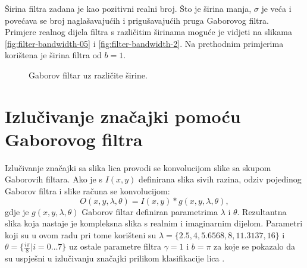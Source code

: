 \documentclass{ru}
\begin{document}
Širina filtra zadana je kao pozitivni realni broj. Što je širina manja,
$\sigma$ je veća i povećava se broj naglašavajućih i prigušavajućih pruga
Gaborovog filtra.~ Primjere realnog dijela filtra s
različitim širinama moguće je vidjeti na slikama \ref{fig:filter-bandwidth-05}
i \ref{fig:filter-bandwidth-2}. Na prethodnim primjerima korištena je širina
filtra od $b = 1$.

\begin{figure}[h!tb]
\centering
{}
\hspace{50pt}
\caption{Gaborov filtar uz različite širine.}
\label{fig:filter-bandwidths}
\end{figure}

\chapter{Izlučivanje značajki pomoću Gaborovog filtra}

Izlučivanje značajki sa slika lica provodi se konvolucijom slike sa skupom
Gaborovih filtara. Ako je s $I(x, y)$ definirana slika sivih razina, odziv pojedinog Gaborov filtra i
slike računa se konvolucijom:
\begin{equation}
O(x,y,\lambda, \theta) = I(x,y) * g(x,y,\lambda, \theta),
\label{konvolucija-filter-slika}
\end{equation}
gdje je $g(x,y,\lambda, \theta)$ Gaborov filtar definiran parametrima $\lambda$
i $\theta$. Rezultantna slika koja nastaje je kompleksna slika s realnim i imaginarnim
dijelom. Parametri koji su u ovom radu pri tome korišteni su $\lambda =
\{2.5, 4, 5.6568, 8, 11.3137, 16\}$ i $\theta = \{ \frac{i \pi}{8} | i =
0 \ldots 7\}$ uz ostale parametre filtra $\gamma = 1$ i $b = \pi$ za koje se
pokazalo da su uspješni u izlučivanju značajki prilikom klasifikacije lica
\citep{shen2007gabor}.
\end{document}
